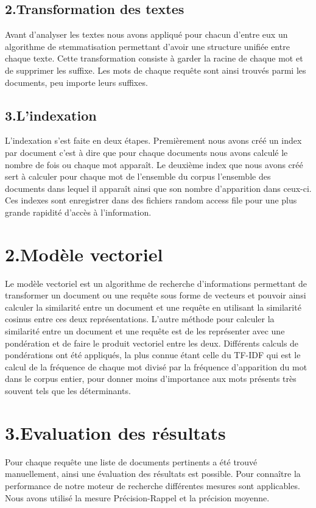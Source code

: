 \documentclass[a4paper,11pt]{report}
\begin{document}
\subsection*{2.Transformation des textes}
Avant d'analyser les textes nous avons appliqué pour chacun d'entre eux un algorithme de stemmatisation permettant d'avoir une structure unifiée entre chaque texte. Cette transformation consiste à garder la racine de chaque mot et de supprimer les suffixe. Les mots de chaque requête sont ainsi trouvés parmi les documents, peu importe leurs suffixes.
\subsection*{3.L'indexation}

L'indexation s'est faite en deux étapes. Premièrement nous avons créé un index par document c'est à dire que pour chaque documents nous avons calculé le nombre de fois ou chaque mot apparaît. Le deuxième index que nous avons créé sert à calculer pour chaque mot de l'ensemble du corpus l'ensemble des documents dans lequel il apparaît ainsi que son nombre d'apparition dans ceux-ci. Ces indexes sont enregistrer dans des fichiers random access file pour une plus grande rapidité d'accès à l'information.

\section*{2.Modèle vectoriel}

Le modèle vectoriel est un algorithme de recherche d'informations permettant de transformer un document ou une requête sous forme de vecteurs et pouvoir ainsi calculer la similarité entre un document et une requête en utilisant la similarité cosinus entre ces deux représentations. L'autre méthode pour calculer la similarité entre un document et une requête est de les représenter avec une pondération et de faire le produit vectoriel entre les deux. Différents calculs de pondérations ont été appliqués, la plus connue étant celle du TF-IDF qui est le calcul de la fréquence de chaque mot divisé par la fréquence d'apparition du mot dans le corpus entier, pour donner moins d'importance aux mots présents très souvent tels que les déterminants. 



\section*{3.Evaluation des résultats}
Pour chaque requête une liste de documents pertinents a été trouvé manuellement, ainsi une évaluation des résultats est possible. Pour connaître la performance de notre moteur de recherche différentes mesures sont applicables. Nous avons utilisé la mesure Précision-Rappel et la précision moyenne.
\end{document}
